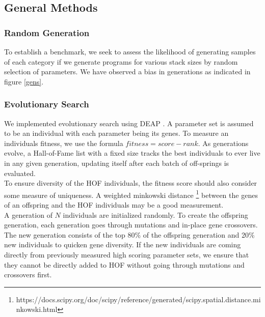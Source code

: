 \documentclass{nime-alternate} %
\begin{document}
\subsection{General Methods}
\subsubsection{Random Generation}
To establish a benchmark, we seek to assess the likelihood of generating samples of each category if we generate programs for various stack sizes by random selection of parameters. We have observed a bias in generations as indicated in figure \ref{gens}.\\



\subsubsection{Evolutionary Search}
We implemented evolutionary search using DEAP \citep{DEAP_JMLR2012}. A parameter set is assumed to be an individual with each parameter being its genes. To measure an individuals fitness, we use the formula $fitness=score-rank$. As generations evolve, a Hall-of-Fame list with a fixed size tracks the best individuals to ever live in any given generation, updating itself after each batch of off-springs is evaluated.\\
To ensure diversity of the HOF individuals, the fitness score should also consider some measure of uniqueness. A weighted minkowski distance \footnote{https://docs.scipy.org/doc/scipy/reference/generated/scipy.spatial.distance.minkowski.html} between the genes of an offspring and the HOF individuals may be a good measurement.\\
A generation of $N$ individuals are initialized randomly. To create the offspring generation, each generation goes through mutations and in-place gene crossovers. The new generation consists of the top 80\% of the offspring generation and 20\% new individuals to quicken gene diversity. If the new individuals are coming directly from previously measured high scoring parameter sets, we ensure that they cannot be directly added to HOF without going through mutations and crossovers first.\\
\end{document}
